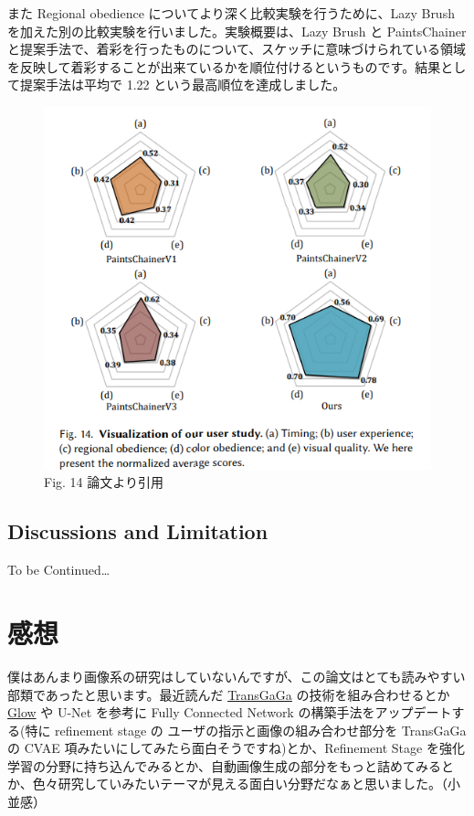 \documentclass[a4paper, dvipdfmx, 10pt]{article}
\begin{document}
また Regional obedience についてより深く比較実験を行うために、Lazy Brush を加えた別の比較実験を行いました。実験概要は、Lazy Brush と PaintsChainer と提案手法で、着彩を行ったものについて、スケッチに意味づけられている領域を反映して着彩することが出来ているかを順位付けるというものです。結果として提案手法は平均で 1.22 という最高順位を達成しました。\\

\begin{figure}[htbp]
\centering
\includegraphics[width=.9\linewidth]{./img/s2p_fig14.PNG}
\caption{Fig. 14 論文より引用}
\end{figure}

\subsection{Discussions and Limitation}
\label{sec:org8752a7c}
To be Continued\ldots{}\\

\section{感想}
\label{sec:orgcf97d7c}
僕はあんまり画像系の研究はしていないんですが、この論文はとても読みやすい部類であったと思います。最近読んだ \href{https://arxiv.org/abs/1904.09571}{TransGaGa} の技術を組み合わせるとか \href{https://arxiv.org/abs/1807.03039}{Glow} や U-Net を参考に Fully Connected Network の構築手法をアップデートする(特に refinement stage の ユーザの指示と画像の組み合わせ部分を TransGaGa の CVAE 項みたいにしてみたら面白そうですね)とか、Refinement Stage を強化学習の分野に持ち込んでみるとか、自動画像生成の部分をもっと詰めてみるとか、色々研究していみたいテーマが見える面白い分野だなぁと思いました。（小並感）\\
\end{document}
